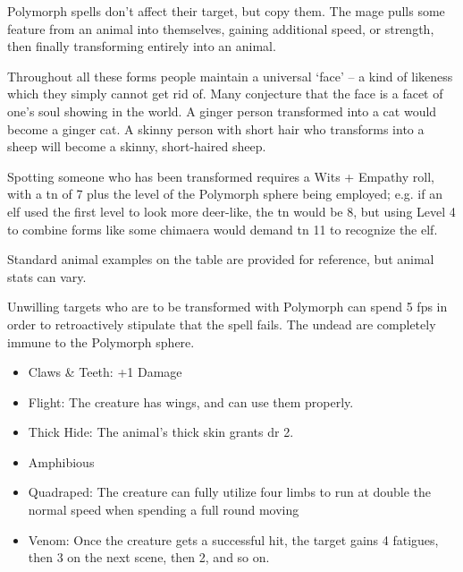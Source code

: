 \begin{multicols}{2}
\begin{figure*}[t]
\end{figure*}


\noindent
Polymorph spells don't affect their target, but copy them.
The mage pulls some feature from an animal into themselves, gaining additional speed, or strength, then finally transforming entirely into an animal.

Throughout all these forms people maintain a universal `face' -- a kind of likeness which they simply cannot get rid of.
Many conjecture that the face is a facet of one's soul showing in the world.
A ginger person transformed into a cat would become a ginger cat.
A skinny person with short hair who transforms into a sheep will become a skinny, short-haired sheep.

Spotting someone who has been transformed requires a Wits + Empathy roll, with a \gls{tn} of 7 plus the level of the Polymorph sphere being employed;
e.g. if an elf used the first level to look more deer-like, the \gls{tn} would be 8, but using Level 4 to combine forms like some chimaera would demand \gls{tn} 11 to recognize the elf.

Standard animal examples on the table are provided for reference, but animal stats can vary.

Unwilling targets who are to be transformed with Polymorph can spend 5 \glspl{fp} in order to retroactively stipulate that the spell fails.
The undead are completely immune to the Polymorph sphere.

\spelllevel

\begin{tcolorbox}[title=Animal Abilities]

\begin{itemize}

	\item{Claws \& Teeth: +1 Damage}
	\item{Flight: The creature has wings, and can use them properly.}
	\item{Thick Hide: The animal's thick skin grants \gls{dr} 2.}
	\item{Amphibious}
	\item{Quadraped: The creature can fully utilize four limbs to run at double the normal speed when spending a full round moving}
	\item
	Venom: Once the creature gets a successful hit, the target gains 4 \glspl{fatigue}, then 3 on the next scene, then 2, and so on.

\end{itemize}


\end{tcolorbox}
\end{multicols}
